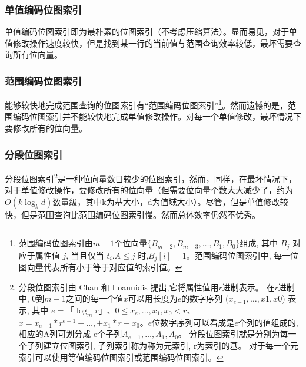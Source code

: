 \documentclass[11pt, a4paper]{article}
\begin{document}
  \subsubsection{单值编码位图索引}

  单值编码位图索引即为最朴素的位图索引（不考虑压缩算法）。显而易见，对于单值修改操作速度较快，但是找到某一行的当前值与范围查询效率较低，最坏需要查询所有位向量。

  \subsubsection{范围编码位图索引}

  能够较快地完成范围查询的位图索引有“范围编码位图索引”\footnote{范围编码位图索引由$m-1$个位向量$\{B_{m-2}, B_{m-3}, \ldots, B_1,  B_0\}$组成, 其中 $B_j$ 对应于属性值 $j$, 当且仅当 $t_i.A \le j$ 时,$B_j[i] =1$。范围编码位图索引中, 每一位图向量代表所有小于等于对应值的索引值。\cite{art3}}。然而遗憾的是，范围编码位图索引并不能较快地完成单值修改操作。对每一个单值修改，最坏情况下要修改所有的位向量。

  \subsubsection{分段位图索引}

  分段位图索引\footnote{分段位图索引由 Chan 和 I oannidis 提出,它将属性值用$r$进制表示。 在$r$进制中, 0到$m - 1$之间的每一个值$x$可以用长度为$e$的数字序列 ($x_{e-1}, …, x1, x0$) 表示, 其中 $e =「\log_m{r}」$、$0≤x_e, …, x_1 , x_0 <r$、$x = x_{e - 1} *r^{e-1} +…, + x_1 *r + x_0$。$e$位数字序列可以看成是$e$个列的值组成的, 相应的A列可划分成 e个子列$A_{e-1}, …, A_1, A_0$。 分段位图索引就是分别为每一个子列建立位图索引, 子列索引称为称为元索引, r为索引的基。 对于每一个元索引可以使用等值编码位图索引或范围编码位图索引。}是一种位向量数目较少的位图索引，然而，同样，在最坏情况下，对于单值修改操作，要修改所有的位向量（但需要位向量个数大大减少了，约为$O(k\log_k{d})$数量级，其中k为基大小，d为值域大小）。尽管，但是单值修改较快，但是范围查询比范围编码位图索引慢。然而总体效率仍然不优秀。
\end{document}
